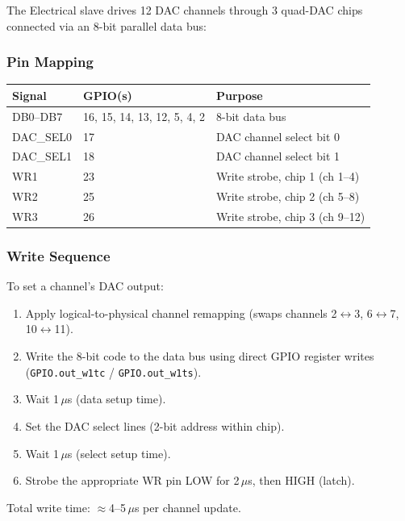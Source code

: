 \documentclass[11pt,a4paper]{article}
\begin{document}
The Electrical slave drives 12 DAC channels through 3 quad-DAC chips
connected via an 8-bit parallel data bus:

\subsubsection{Pin Mapping}

\begin{center}
\begin{tabular}{lll}
\toprule
\textbf{Signal} & \textbf{GPIO(s)} & \textbf{Purpose} \\
\midrule
DB0--DB7  & 16, 15, 14, 13, 12, 5, 4, 2 & 8-bit data bus \\
DAC\_SEL0 & 17 & DAC channel select bit 0 \\
DAC\_SEL1 & 18 & DAC channel select bit 1 \\
WR1       & 23 & Write strobe, chip 1 (ch 1--4) \\
WR2       & 25 & Write strobe, chip 2 (ch 5--8) \\
WR3       & 26 & Write strobe, chip 3 (ch 9--12) \\
\bottomrule
\end{tabular}
\end{center}

\subsubsection{Write Sequence}

To set a channel's DAC output:

\begin{enumerate}
  \item Apply logical-to-physical channel remapping (swaps channels 2$\leftrightarrow$3, 6$\leftrightarrow$7, 10$\leftrightarrow$11).
  \item Write the 8-bit code to the data bus using direct GPIO register writes (\texttt{GPIO.out\_w1tc} / \texttt{GPIO.out\_w1ts}).
  \item Wait 1\,$\mu$s (data setup time).
  \item Set the DAC select lines (2-bit address within chip).
  \item Wait 1\,$\mu$s (select setup time).
  \item Strobe the appropriate WR pin LOW for 2\,$\mu$s, then HIGH (latch).
\end{enumerate}

Total write time: $\approx$4--5\,$\mu$s per channel update.
\end{document}

